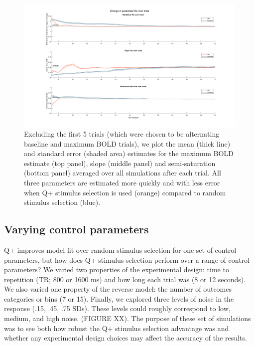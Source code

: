 \documentclass[
  english,
  man,floatsintext]{apa6}
\begin{document}
\begin{figure}
  
  {\centering \includegraphics[width=500px]{../results/figs/fig3_7Outcomes_15Noise_12trialLength_800TR} 
  
  }
  
  \caption{Excluding the first 5 trials (which were chosen to be alternating baseline and maximum BOLD trials), we plot the mean (thick line) and standard error (shaded area) estimates for the maximum BOLD estimate (top panel), slope (middle panel) and semi-saturation (bottom panel) averaged over all simulations after each trial. All three parameters are estimated more quickly and with less error when Q+ stimulus selection is used (orange) compared to random stimulus selection (blue).
\newpage}\label{fig:results-figure-firstsims-3}
  \end{figure}




\hypertarget{varying-control-parameters}{%
\subsection{Varying control parameters}\label{varying-control-parameters}}

Q+ improves model fit over random stimulus selection for one set of control parameters, but how does Q+ stimulus selection perform over a range of control parameters? We varied two properties of the experimental design: time to repetition (TR; 800 or 1600 ms) and how long each trial was (8 or 12 seconds). We also varied one property of the reverse model: the number of outcomes categories or bins (7 or 15). Finally, we explored three levels of noise in the response (.15, .45, .75 SDs). These levels could roughly correspond to low, medium, and high noise. (FIGURE XX). The purpose of these set of simulations was to see both how robust the Q+ stimulus selection advantage was and whether any experimental design choices may affect the accuracy of the results.
\end{document}
